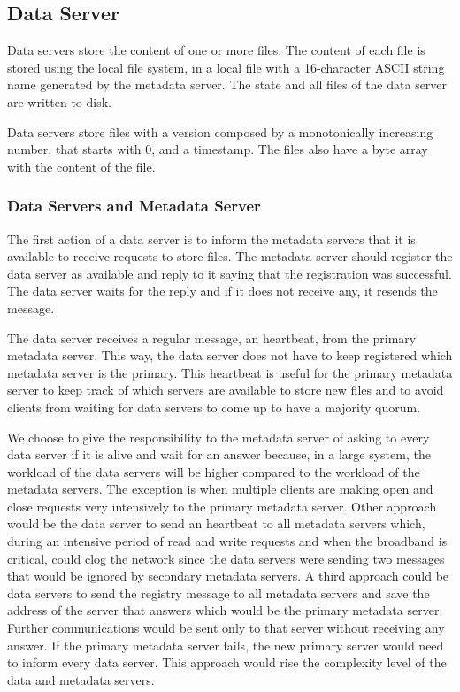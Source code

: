 \subsection{Data Server}

Data servers store the content of one or more files. The content of each
file is stored using the local file system, in a local file with a
16-character ASCII string name generated by the metadata server. The
state and all files of the data server are written to disk.

Data servers store files with a version composed by a
monotonically increasing number, that starts with 0, and a timestamp.
The files also have a byte array with the content of the file.

\subsubsection{Data Servers and Metadata Server}

The first action of a data server is to inform the metadata servers that
it is available to receive requests to store files. The metadata
server should register the data server as available and reply to it saying 
that the registration was successful. The data server waits for the
reply and if it does not receive any, it resends the message.

The data server receives a regular message, an heartbeat, from the primary
metadata server. This way, the data server does not have to keep
registered which metadata server is the primary.
This heartbeat is useful for the primary metadata server to keep track of
which servers are available to store new files and to avoid clients
from waiting for data servers to come up to have a majority quorum.

We choose to give the responsibility to the metadata server of asking to
every data server if it is alive and wait for an answer because, in a large
system, the workload of the data servers will be higher compared to the
workload of the metadata servers. The exception is when multiple clients
are making open and close requests very intensively to the primary metadata 
server. Other approach would be the data server to send an heartbeat to all 
metadata servers which, during an intensive period of read and write requests
and when the broadband is critical, could clog the network since the data 
servers were sending two messages that would be ignored by secondary 
metadata servers.
A third approach could be data servers to send the registry message to all
metadata servers and save the address of the server that answers which 
would be the primary metadata server. Further communications would be sent 
only to that server without receiving any answer. If the primary
metadata server fails, the new primary server would need to inform every data
server. This approach would rise the complexity level of the data and
metadata servers.


